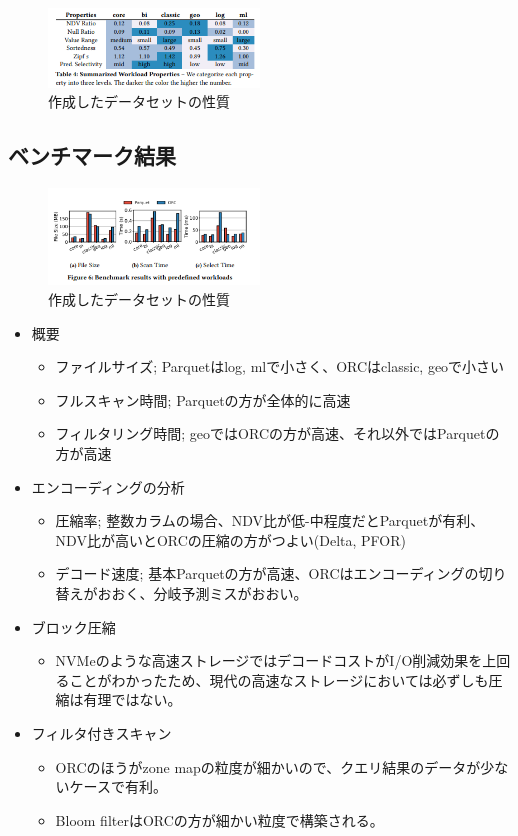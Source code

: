 \documentclass[uplatex]{jsarticle}
\theoremstyle{remark}
\begin{document}
\begin{figure}
  \centering
  \includegraphics[width=0.5\textwidth]{img/dataset-workload.png}
  \caption{作成したデータセットの性質}
  \label{fig:dataset-workload}
\end{figure}

\subsection{ベンチマーク結果}

\begin{figure}
  \centering
  \includegraphics[width=0.5\textwidth]{img/columnar-storage-format-result1.png}
  \caption{作成したデータセットの性質}
  \label{fig:result1}
\end{figure}

\begin{itemize}
  \item 概要
  \begin{itemize}
    \item ファイルサイズ; Parquetはlog, mlで小さく、ORCはclassic, geoで小さい
    \item フルスキャン時間; Parquetの方が全体的に高速
    \item フィルタリング時間; geoではORCの方が高速、それ以外ではParquetの方が高速
  \end{itemize}
  \item エンコーディングの分析
  \begin{itemize}
    \item 圧縮率; 整数カラムの場合、NDV比が低-中程度だとParquetが有利、NDV比が高いとORCの圧縮の方がつよい(Delta, PFOR)
    \item デコード速度; 基本Parquetの方が高速、ORCはエンコーディングの切り替えがおおく、分岐予測ミスがおおい。
  \end{itemize}
  \item ブロック圧縮
  \begin{itemize}
    \item NVMeのような高速ストレージではデコードコストがI/O削減効果を上回ることがわかったため、現代の高速なストレージにおいては必ずしも圧縮は有理ではない。
  \end{itemize}
  \item フィルタ付きスキャン
  \begin{itemize}
    \item ORCのほうがzone mapの粒度が細かいので、クエリ結果のデータが少ないケースで有利。
    \item Bloom filterはORCの方が細かい粒度で構築される。
  \end{itemize}
\end{itemize}
\end{document}
